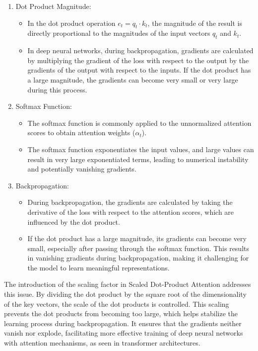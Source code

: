 \documentclass{report}
\begin{document}
\begin{enumerate}
\item Dot Product Magnitude:
\begin{itemize}
\item In the dot product operation \(e_t = q_t \cdot k_t\), the magnitude of the result is directly proportional to the magnitudes of the input vectors \(q_t\) and \(k_t\).
\item In deep neural networks, during backpropagation, gradients are calculated by multiplying the gradient of the loss with respect to the output by the gradients of the output with respect to the inputs. If the dot product has a large magnitude, the gradients can become very small or very large during this process.
\end{itemize}

\item Softmax Function:
\begin{itemize}
\item The softmax function is commonly applied to the unnormalized attention scores to obtain attention weights (\(\alpha_t\)).
\item The softmax function exponentiates the input values, and large values can result in very large exponentiated terms, leading to numerical instability and potentially vanishing gradients.
\end{itemize}

\item Backpropagation:
\begin{itemize}
\item During backpropagation, the gradients are calculated by taking the derivative of the loss with respect to the attention scores, which are influenced by the dot product.
\item If the dot product has a large magnitude, its gradients can become very small, especially after passing through the softmax function. This results in vanishing gradients during backpropagation, making it challenging for the model to learn meaningful representations.
\end{itemize}
\end{enumerate}

The introduction of the scaling factor in Scaled Dot-Product Attention addresses this issue. By dividing the dot product by the square root of the dimensionality of the key vectors, the scale of the dot products is controlled. This scaling prevents the dot products from becoming too large, which helps stabilize the learning process during backpropagation. It ensures that the gradients neither vanish nor explode, facilitating more effective training of deep neural networks with attention mechanisms, as seen in transformer architectures.
\end{document}
